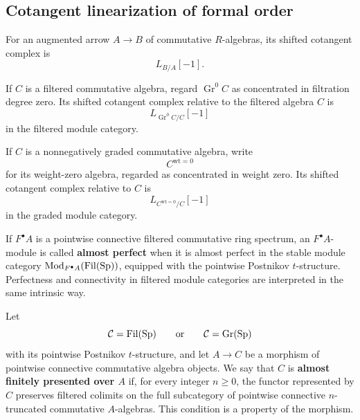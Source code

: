 \subsection{Cotangent linearization of formal order}

\begin{definition}
\label{def:shifted-cotangent-augmentation}
For an augmented arrow \(A\to B\) of commutative \(R\)-algebras, its shifted
cotangent complex is
\[
    L_{B/A}[-1].
\]

If \(C\) is a filtered commutative algebra, regard
\(\operatorname{Gr}^0C\) as concentrated in filtration degree zero. Its shifted
cotangent complex relative to the filtered algebra \(C\) is
\[
    L_{\operatorname{Gr}^0C/C}[-1]
\]
in the filtered module category.

If \(C\) is a nonnegatively graded commutative algebra, write
\[
    C^{\mathrm{wt}=0}
\]
for its weight-zero algebra, regarded as concentrated in weight zero. Its
shifted cotangent complex relative to \(C\) is
\[
    L_{C^{\mathrm{wt}=0}/C}[-1]
\]
in the graded module category.
\end{definition}

\begin{convention}
\label{conv:almost-perfect-filtered-modules}
If \(F^\bullet A\) is a pointwise connective filtered commutative ring
spectrum, an
\(F^\bullet A\)-module is called \textbf{almost perfect} when it is almost
perfect in the stable module category
\(\operatorname{Mod}_{F^\bullet A}(\operatorname{Fil}(\operatorname{Sp}))\), equipped with the pointwise
Postnikov \(t\)-structure. Perfectness and connectivity in filtered module
categories are interpreted in the same intrinsic way.
\end{convention}


\begin{convention}
\label{conv:filtered-graded-almost-finite-presentation}
Let
\[
    \mathcal C=\operatorname{Fil}(\operatorname{Sp})
    \qquad\text{or}\qquad
    \mathcal C=\operatorname{Gr}(\operatorname{Sp})
\]
with its pointwise Postnikov \(t\)-structure, and let \(A\to C\) be a
morphism of pointwise connective commutative algebra objects. We say that
\(C\) is \textbf{almost finitely presented over \(A\)} if, for every integer
\(n\geq0\), the functor represented by \(C\) preserves filtered colimits on
the full subcategory of pointwise connective \(n\)-truncated commutative
\(A\)-algebras. This condition is a property of the morphism.
\end{convention}

